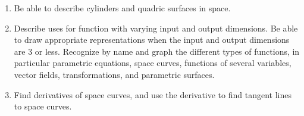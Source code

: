

\begin{enumerate}
\item Be able to describe cylinders and quadric surfaces in space.
\item Describe uses for function with varying input and output
  dimensions.  Be able to draw appropriate representations when the
  input and output dimensions are 3 or less. Recognize by name and
  graph the different types of functions, in particular parametric
  equations, space curves, functions of several variables, vector
  fields, transformations, and parametric surfaces.
\item Find derivatives of space curves, and use the derivative to find
  tangent lines to space curves.
\end{enumerate}


